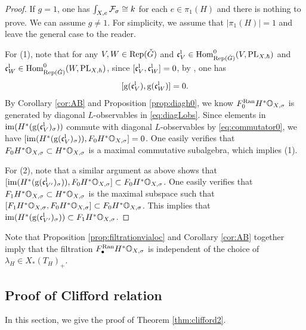 \documentclass[reqno]{amsart}
\numberwithin{equation}{section}
\numberwithin{equation}{section}
\begin{document}
\begin{proof}
    If $g=1$, one has $\int_{X,e}\mathcal{F}_{\sigma}\cong k$ for each $e\in\pi_1(H)$ and there is nothing to prove. We can assume $g\neq 1$. For simplicity, we assume that $|\pi_1(H)|=1$ and leave the general case to the reader.
    
    For (1), note that for any $V,W\in \operatorname{Rep}(\check{G})$ and $\mathfrak{c}_V^{\mathrm{l}}\in \operatorname{Hom}^0_{\operatorname{Rep}(\check{G})}(V, \mathrm{PL}_{X,\hbar})$ and $\mathfrak{c}_W^{\mathrm{l}}\in \operatorname{Hom}^0_{\operatorname{Rep}(\check{G})}(W, \mathrm{PL}_{X,\hbar})$, since $[\mathfrak{c}_V^{\mathrm{l}},\mathfrak{c}_W^{\mathrm{l}}]=0$, by \cite[Theorem\,4.47]{liu2025higherperiodintegralsderivatives}, one has \begin{equation}\label{eq:commutator0}[\mathrm{g}(\mathfrak{c}_V^{\mathrm{l}}),\mathrm{g}(\mathfrak{c}_W^{\mathrm{l}})]=0.\end{equation} By Corollary \ref{cor:AB} and Proposition \ref{prop:diagh0}, we know $F_0^{\mathrm{Ran}}H^*\mathbb{O}_{X,\sigma}$ is generated by diagonal $L$-observables in \eqref{eq:diagLobs}. Since elements in $\mathrm{im}(H^*(\mathrm{g}(\mathfrak{c}_V^{\mathrm{l}})_{\sigma}))$ commute with diagonal $L$-observables by \eqref{eq:commutator0}, we have $[\mathrm{im}(H^*(\mathrm{g}(\mathfrak{c}_V^{\mathrm{l}})_{\sigma})),F_0H^*\mathbb{O}_{X,\sigma}]=0$. One easily verifies that $F_0H^*\mathbb{O}_{X,\sigma}\subset H^*\mathbb{O}_{X,\sigma}$ is a maximal commutative subalgebra, which implies (1).

    For (2), note that a similar argument as above shows that $[\mathrm{im}(H^*(\mathrm{g}(\mathfrak{c}_{V'}^{\mathrm{l}})_{\sigma})),F_0H^*\mathbb{O}_{X,\sigma}]\subset F_0H^*\mathbb{O}_{X,\sigma}$. One easily verifies that $F_1H^*\mathbb{O}_{X,\sigma}\subset H^*\mathbb{O}_{X,\sigma}$ is the maximal subspace such that $[F_1H^*\mathbb{O}_{X,\sigma},F_0H^*\mathbb{O}_{X,\sigma}]\subset F_0H^*\mathbb{O}_{X,\sigma}$. This implies that $\mathrm{im}(H^*(\mathrm{g}(\mathfrak{c}_{V'}^{\mathrm{l}})_{\sigma}))\subset F_1H^*\mathbb{O}_{X,\sigma}$.
\end{proof}

Note that Proposition \ref{prop:filtrationvialoc} and Corollary \ref{cor:AB} together imply that the filtration $F_{\bullet}^{\mathrm{Ran}}H^*\mathbb{O}_{X,\sigma}$ is independent of the choice of $\lambda_H\in X_*(T_H)_+$.






\subsection{Proof of Clifford relation}\label{sec:relproof}
In this section, we give the proof of Theorem \ref{thm:clifford2}.
\end{document}
